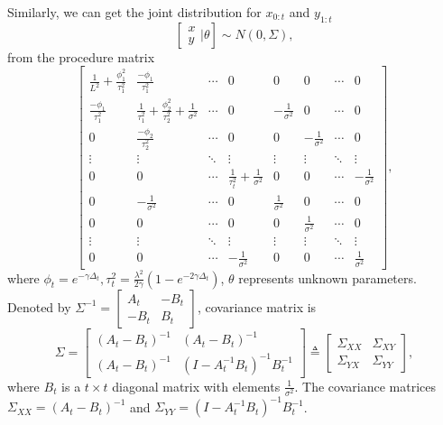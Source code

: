 Similarly, we can get the joint distribution for $x_{0:t}$ and $y_{1:t}$ 
\begin{equation*}
\left[ \begin{matrix} x\\y  \end{matrix}\bigg\rvert \theta \right]
\sim N\left(0, \Sigma  \right),
\end{equation*}
from the procedure matrix 
\begin{equation*}
\begin{bmatrix}
\frac{1}{L^2}+\frac{\phi_1^2}{\tau_1^2} & \frac{-\phi_1}{\tau_1^2} & \cdots & 0 & 0 & 0& \cdots & 0\\ 
\frac{-\phi_1}{\tau_1^2}   &\frac{1}{\tau_1^2}+\frac{\phi_2^2}{\tau_2^2}+\frac{1}{\sigma^2}& \cdots & 0 & -\frac{1}{\sigma^2} &0 & \cdots & 0 \\
0 & \frac{-\phi_2}{\tau_2^2}   &  \cdots & 0 & 0& -\frac{1}{\sigma^2} & \cdots & 0\\
\vdots & \vdots & \ddots & \vdots & \vdots & \vdots & \ddots & \vdots \\
0 & 0   &  \cdots & \frac{1}{\tau_t^2}+\frac{1}{\sigma^2} & 0 & 0 & \cdots &-\frac{1}{\sigma^2}\\
0 & -\frac{1}{\sigma^2}  & \cdots & 0 & \frac{1}{\sigma^2} & 0 & \cdots & 0 \\
0& 0 & \cdots & 0 & 0 &  \frac{1}{\sigma^2} & \cdots & 0\\
\vdots & \vdots & \ddots & \vdots & \vdots & \vdots & \ddots & \vdots\\
0 & 0& \cdots &-\frac{1}{\sigma^2} & 0 & 0 & \cdots &  \frac{1}{\sigma^2}
\end{bmatrix},
\end{equation*}
where $\phi_t = e^{-\gamma\Delta_t}, \tau^2_t = \frac{\lambda^2}{2\gamma}\left(1-e^{-2\gamma\Delta_t}\right)$, $\theta$ represents unknown parameters. Denoted by $\Sigma^{-1}=\begin{bmatrix} A_t & -B_t \\ -B_t & B_t\end{bmatrix}$, covariance matrix is 
\begin{equation}
\Sigma=\begin{bmatrix} (A_t-B_t)^{-1} &  (A_t-B_t)^{-1} \\ (A_t-B_t)^{-1} & (I-A_t^{-1}B_t)^{-1}B_t^{-1} \end{bmatrix} \triangleq \begin{bmatrix}
\Sigma_{XX} & \Sigma_{XY}  \\ \Sigma_{YX} & \Sigma_{YY} 
\end{bmatrix},
\end{equation}
where $B_t$ is a $t\times t$ diagonal matrix with elements $\frac{1}{\sigma^2}$. The covariance matrices $\Sigma_{XX} =  (A_t-B_t)^{-1}$ and $\Sigma_{YY} =  (I-A_t^{-1}B_t)^{-1}B_t^{-1}$. 





